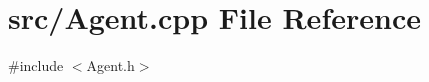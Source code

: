 \section{src/\+Agent.cpp File Reference}
\label{_agent_8cpp}
{\ttfamily \#include $<$Agent.\+h$>$}\newline

